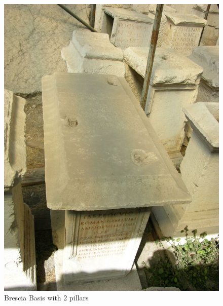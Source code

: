 \documentclass[amsthm,ebook]{saparticle}
\begin{document}
\begin{figure}[!bp]
\centering
\includegraphics[scale=0.5]{images/fig03}
\caption{Brescia Basis with 2 pillars}
\label{fig:3}
\end{figure}
\end{document}
